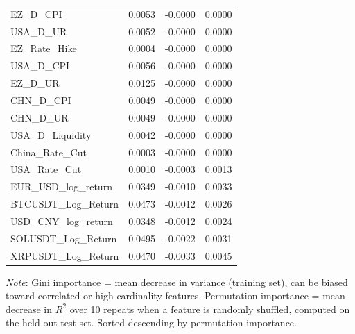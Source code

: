 \begin{table}[h]
\begin{tabular}{lccc}
    EZ\_D\_CPI & 0.0053 & -0.0000 & 0.0000 \\ 
    USA\_D\_UR & 0.0052 & -0.0000 & 0.0000 \\ 
    EZ\_Rate\_Hike & 0.0004 & -0.0000 & 0.0000 \\ 
    USA\_D\_CPI & 0.0056 & -0.0000 & 0.0000 \\ 
    EZ\_D\_UR & 0.0125 & -0.0000 & 0.0000 \\ 
    CHN\_D\_CPI & 0.0049 & -0.0000 & 0.0000 \\ 
    CHN\_D\_UR & 0.0049 & -0.0000 & 0.0000 \\ 
    USA\_D\_Liquidity & 0.0042 & -0.0000 & 0.0000 \\ 
    China\_Rate\_Cut & 0.0003 & -0.0000 & 0.0000 \\ 
    USA\_Rate\_Cut & 0.0010 & -0.0003 & 0.0013 \\ 
    EUR\_USD\_log\_return & 0.0349 & -0.0010 & 0.0033 \\ 
    BTCUSDT\_Log\_Return & 0.0473 & -0.0012 & 0.0026 \\ 
    USD\_CNY\_log\_return & 0.0348 & -0.0012 & 0.0024 \\ 
    SOLUSDT\_Log\_Return & 0.0495 & -0.0022 & 0.0031 \\ 
    XRPUSDT\_Log\_Return & 0.0470 & -0.0033 & 0.0045 \\ 
    \bottomrule
  \end{tabular}
  \vspace{2pt}
  \footnotesize{\textit{Note}: Gini importance = mean decrease in variance (training set), can be biased toward correlated or high-cardinality features. Permutation importance = mean decrease in $R^2$ over 10 repeats when a feature is randomly shuffled, computed on the held-out test set. Sorted descending by permutation importance.}\\
\end{table}